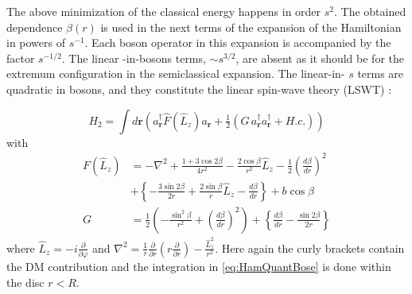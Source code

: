 \documentclass[aps,prb,twocolumn,superscriptaddress,nobalancelastpage]{revtex4-1}
\begin{document}
The above minimization of the classical energy happens in order $s^{2}$. The obtained dependence $\beta(r)$ is used in the next terms of the expansion of the Hamiltonian in powers of $s^{-1}$.  Each boson operator in this expansion is accompanied by the factor $s^{-1/2}$. The linear -in-bosons terms, $\sim s^{3/2}$, are absent as it should be for the extremum configuration in the semiclassical expansion. 
The  linear-in- $s$ terms are quadratic in bosons, and they constitute the linear spin-wave theory (LSWT) \cite{Schutte2014}:

\begin{equation}
H_{2}= \int d\mathbf{r} 
\left(   a_{\mathbf{r}}^\dag \hat F(\hat  L_{z} ) {a_{\mathbf{r}}} 
+ \tfrac{1}{2} \left( 
 G \, a_{\mathbf{r}}^\dag a_{\mathbf{r}}^\dag  + H.c. \right) 
\right)
\label{eq:HamQuantBose}
\end{equation}
with 
\begin{equation} 
\begin{aligned} 
  F  (\hat  L_{z} )&=    - \nabla^{2}  + \frac{1 + 3\cos 2\beta }{4r^2} - \frac{2\cos \beta }{r^2}\hat{L}_{z} - \frac{1}{2}\left( \frac{d\beta }{dr} \right)^2  \\
& +  \left\{  - \frac{3\sin 2\beta }{2r} + \frac{2\sin \beta }{r}\hat{L}_{z}  - \frac{d\beta }{dr} \right\} + b\cos \beta   \\ 
G &= \frac{1}{2}\left(  - \frac{\sin ^2\beta }{r^2} + \left( \frac{d\beta }{dr} \right)^2 \right) 
+ \left\{ \frac{d\beta }{dr} - \frac{\sin 2\beta }{2r} \right\}
  \end{aligned}  
 \end{equation} 
where  $\hat  L_{z} =  - i\frac{\partial }{\partial \varphi }$
and
$\nabla^{2}   = \frac{1}{r}\frac{\partial }{\partial r}\left( r\frac{\partial }{\partial r} \right) - \frac{\hat{L}_{z} ^2}{r^2}$.  Here again the curly brackets contain the DM contribution and the integration in \eqref{eq:HamQuantBose} is done within the disc $r<R$.  
\end{document}
